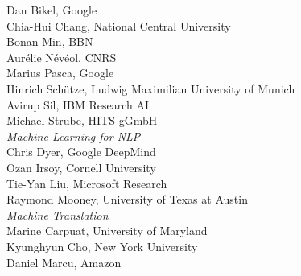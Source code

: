                                     \hspace*{0.2in} Dan Bikel, Google \\
                                    \hspace*{0.2in} Chia-Hui Chang, National Central University \\
                                    \hspace*{0.2in} Bonan Min, BBN \\
                                    \hspace*{0.2in} Aurélie Névéol, CNRS \\
                                    \hspace*{0.2in} Marius Pasca, Google \\
                                    \hspace*{0.2in} Hinrich Schütze, Ludwig Maximilian University of Munich \\
                                    \hspace*{0.2in} Avirup Sil, IBM Research AI \\
                                    \hspace*{0.2in} Michael Strube, HITS gGmbH \\
                            \emph{Machine Learning for NLP} \\
                                    \hspace*{0.2in} Chris Dyer, Google DeepMind \\
                                    \hspace*{0.2in} Ozan Irsoy, Cornell University \\
                                    \hspace*{0.2in} Tie-Yan Liu, Microsoft Research \\
                                    \hspace*{0.2in} Raymond Mooney, University of Texas at Austin  \\
                            \emph{Machine Translation} \\
                                    \hspace*{0.2in} Marine Carpuat, University of Maryland \\
                                    \hspace*{0.2in} Kyunghyun Cho, New York University \\
                                    \hspace*{0.2in} Daniel Marcu, Amazon \\
